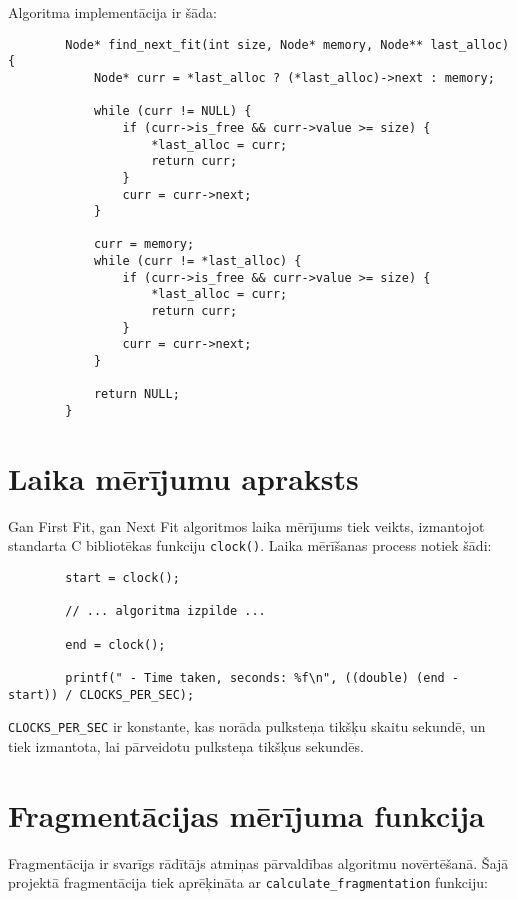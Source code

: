 \documentclass{report}
\begin{document}
	Algoritma implementācija ir šāda:
	
	\begin{verbatim}
		Node* find_next_fit(int size, Node* memory, Node** last_alloc) {
			Node* curr = *last_alloc ? (*last_alloc)->next : memory;
			
			while (curr != NULL) {
				if (curr->is_free && curr->value >= size) {
					*last_alloc = curr;
					return curr;
				}
				curr = curr->next;
			}
			
			curr = memory;
			while (curr != *last_alloc) {
				if (curr->is_free && curr->value >= size) {
					*last_alloc = curr;
					return curr;
				}
				curr = curr->next;
			}
			
			return NULL; 
		}
	\end{verbatim}
	
	\section{Laika mērījumu apraksts}
	
	Gan First Fit, gan Next Fit algoritmos laika mērījums tiek veikts, izmantojot standarta C bibliotēkas funkciju \texttt{clock()}. Laika mērīšanas process notiek šādi:
	
	\begin{verbatim}
		start = clock();
		
		// ... algoritma izpilde ...
		
		end = clock();
		
		printf(" - Time taken, seconds: %f\n", ((double) (end - start)) / CLOCKS_PER_SEC);
	\end{verbatim}
	
	\texttt{CLOCKS\_PER\_SEC} ir konstante, kas norāda pulksteņa tikšķu skaitu sekundē, un tiek izmantota, lai pārveidotu pulksteņa tikšķus sekundēs.
	
	\section{Fragmentācijas mērījuma funkcija}
	
	Fragmentācija ir svarīgs rādītājs atmiņas pārvaldības algoritmu novērtēšanā. Šajā projektā fragmentācija tiek aprēķināta ar \texttt{calculate\_fragmentation} funkciju:
	
\end{document}
